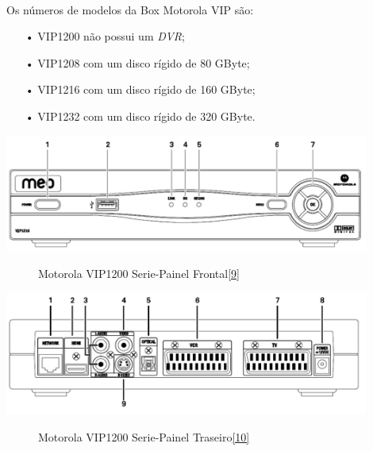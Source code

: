 \documentclass{report}
\begin{document}
\newpage

\paragraph{}Os números de modelos da Box Motorola VIP são:

\begin{itemize}
\item[•]VIP1200 não possui um \textit{DVR};
\item[•]VIP1208 com um disco rígido de 80 GByte;
\item[•]VIP1216 com um disco rígido de 160 GByte;
\item[•]VIP1232 com um disco rígido de 320 GByte.
\end{itemize}

\begin{center}
\includegraphics[width=12cm]{Motorola_VIP1200_Serie-Painel_Frontal.pdf} 
\begin{figure}[h]
\caption{Motorola VIP1200 Serie-Painel Frontal\href{https://conteudos.meo.pt/meo/Documentos/Manuais/Box/MEO-Fibra-ADSL/Manual-Instalacao-Motorola.pdf}{[9]}}
\end{figure}
\end{center}

\begin{center}
\includegraphics[width=12cm]{Motorola_VIP1200_Serie-Painel_Traseiro.pdf} 
\begin{figure}[h]
\caption{Motorola VIP1200 Serie-Painel Traseiro\href{https://conteudos.meo.pt/meo/Documentos/Manuais/Box/MEO-Fibra-ADSL/Manual-Instalacao-Motorola.pdf}{[10]}}
\end{figure}
\end{center}
\end{document}
